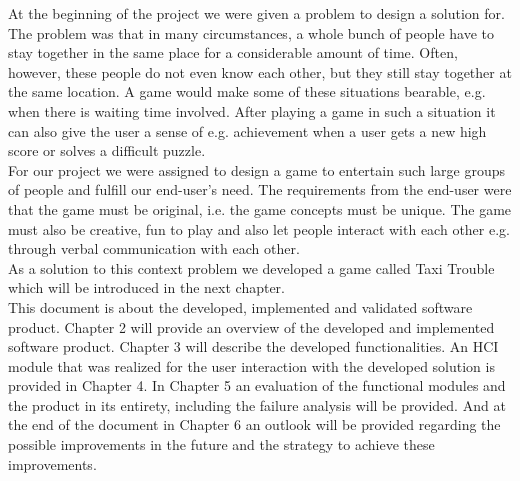 At the beginning of the project we were given a problem to design a solution for. The problem was that in many
circumstances, a whole bunch of people have to stay together in the same place for a considerable amount of
time. Often, however, these people do not even know each other, but they still stay together at the same location. A game would make some of these situations bearable, e.g. when there is waiting time involved. After playing a game in such a situation it can also give the user a sense of e.g. achievement when a user gets a new high score or solves a difficult puzzle. \\
For our project we were assigned to design a game to entertain such large groups of people and fulfill our end-user's need. The requirements from the end-user were that the game must be original, i.e. the game concepts must be unique. The game must also be creative, fun to play and also let people interact with each other e.g. through verbal communication with each other. \\
As a solution to this context problem we developed a game called Taxi Trouble which will be introduced in the next chapter. \\
\newline
This document is about the developed, implemented and validated software product. Chapter 2 will provide an overview of the developed and implemented software product. Chapter 3 will describe the developed functionalities. An HCI module that was realized for the user interaction with the developed solution is provided in Chapter 4.  In Chapter 5 an evaluation of the functional modules and the product in its entirety, including the failure analysis will be provided. And at the end of the document in Chapter 6 an outlook will be provided regarding the possible improvements in the future and the strategy to achieve these improvements.
